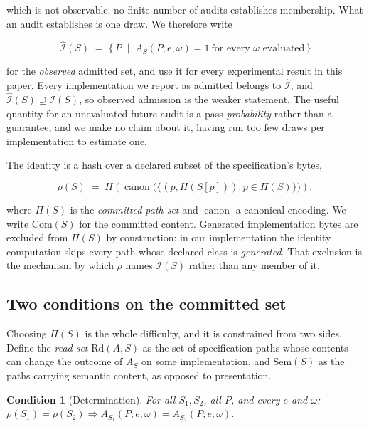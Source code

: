 \documentclass[10pt,twocolumn]{article}
\newtheorem{condition}{Condition}
\newcommand{\Com}{\mathrm{Com}}
\newcommand{\Rd}{\mathrm{Rd}}
\newcommand{\Sem}{\mathrm{Sem}}
\begin{document}
which is not observable: no finite number of audits establishes
membership. What an audit establishes is one draw. We therefore write

\begin{equation}
\widehat{\mathcal{I}}(S) \;=\; \{\,P \;\mid\; A_S(P;e,\omega) = 1
  \ \text{for every } \omega \text{ evaluated}\,\}
\label{eq:observed}
\end{equation}

for the \emph{observed} admitted set, and use it for every experimental
result in this paper. Every implementation we report as admitted belongs
to $\widehat{\mathcal{I}}$, and $\widehat{\mathcal{I}}(S) \supseteq
\mathcal{I}(S)$, so observed admission is the weaker statement. The
useful quantity for an unevaluated future audit is a pass
\emph{probability} rather than a guarantee, and we make no claim about
it, having run too few draws per implementation to estimate one.

The identity is a hash over a declared subset of the specification's
bytes,

\begin{equation}
\rho(S) \;=\; H\!\left(\operatorname{canon}\big(\{(p, H(S[p])) : p \in \Pi(S)\}\big)\right),
\label{eq:root}
\end{equation}

where $\Pi(S)$ is the \emph{committed path set} and $\operatorname{canon}$
a canonical encoding. We write $\Com(S)$ for the committed content.
Generated implementation bytes are excluded from $\Pi(S)$ by
construction: in our implementation the identity computation skips every
path whose declared class is \emph{generated}. That exclusion is the
mechanism by which $\rho$ names $\mathcal{I}(S)$ rather than any member
of it.

\subsection{Two conditions on the committed set}

Choosing $\Pi(S)$ is the whole difficulty, and it is constrained from
two sides. Define the \emph{read set} $\Rd(A,S)$ as the set of
specification paths whose contents can change the outcome of $A_S$ on
some implementation, and $\Sem(S)$ as the paths carrying semantic
content, as opposed to presentation.

\begin{condition}[Determination]
\label{cond:det}
For all $S_1, S_2$, all $P$, and every $e$ and $\omega$:
$\rho(S_1) = \rho(S_2) \Rightarrow
A_{S_1}(P;e,\omega) = A_{S_2}(P;e,\omega)$.
\end{condition}
\end{document}
